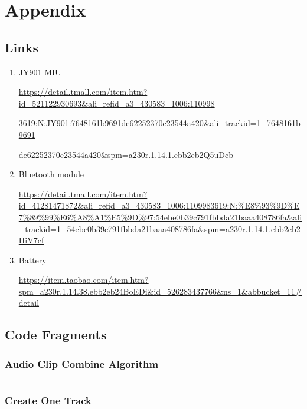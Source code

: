 \section{Appendix}

\subsection{Links}

\begin{enumerate}
\item JY901 MIU

\url{https://detail.tmall.com/item.htm?id=521122930693&ali_refid=a3_430583_1006:110998}

\url{3619:N:JY901:7648161b9691de62252370e23544a420&ali_trackid=1_7648161b9691}

\url{ de62252370e23544a420&spm=a230r.1.14.1.ebb2eb2Q5uDcb} 

\item  Bluetooth module 

\url{https://detail.tmall.com/item.htm?id=41281471872&ali_refid=a3_430583_1006:1109983619:N:%E8%93%9D%E7%89%99%E6%A8%A1%E5%9D%97:54ebe0b39c791fbbda21baaa408786fa&ali_trackid=1_54ebe0b39c791fbbda21baaa408786fa&spm=a230r.1.14.1.ebb2eb2HiV7cf}
\item  Battery 

\url{https://item.taobao.com/item.htm?spm=a230r.1.14.38.ebb2eb24BoEDi&id=526283437766&ns=1&abbucket=11#detail} 

\end{enumerate}


\subsection{Code Fragments}


\subsubsection{Audio Clip Combine Algorithm}
\inputminted[fontsize=\small,tabsize=4]{csharp}{scr/ACCombine.cs}

\newpage

\subsubsection{Create One Track}
\inputminted[fontsize=\small,tabsize=4]{csharp}{scr/CreateOneTrack.cs}
\newpage
\inputminted[fontsize=\small,tabsize=4]{csharp}{scr/cot2.cs}


